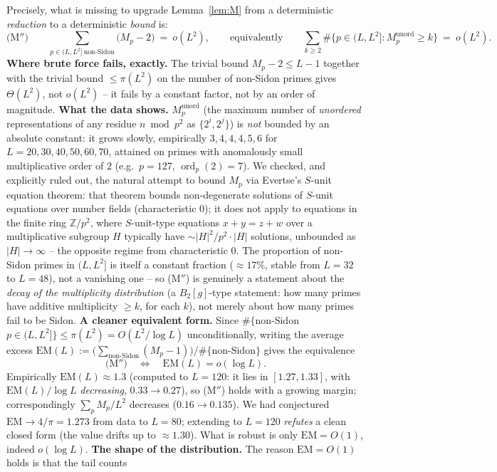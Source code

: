 \documentclass[11pt]{article}
\theoremstyle{plain}
\theoremstyle{definition}
\theoremstyle{remark}
\newcommand{\Z}{\mathbb{Z}}
\newcommand{\ord}{\operatorname{ord}}
\begin{document}
Precisely, what is missing to upgrade Lemma~\ref{lem:M} from a deterministic
\emph{reduction} to a deterministic \emph{bound} is:
\[
\text{(M$''$)}\qquad
\sum_{p\in(L,L^2]\ \mathrm{non\text{-}Sidon}}\bigl(M_p-2\bigr)\ =\ o(L^2),
\qquad\text{equivalently}\qquad
\sum_{k\ge2}\#\{p\in(L,L^2]:M_p^{\mathrm{unord}}\ge k\}\ =\ o(L^2).
\]
\textbf{Where brute force fails, exactly.} The trivial bound
$M_p-2\le L-1$ together with the trivial bound $\le\pi(L^2)$ on the number of
non-Sidon primes gives $\Theta(L^2)$, not $o(L^2)$ -- it fails by a constant
factor, not by an order of magnitude. \textbf{What the data shows.}
$M_p^{\mathrm{unord}}$ (the maximum number of \emph{unordered}
representations of any residue $n\bmod p^2$ as $\{2^i,2^j\}$) is \emph{not}
bounded by an absolute constant: it grows slowly, empirically
$3,4,4,4,5,6$ for $L=20,30,40,50,60,70$, attained on primes with anomalously
small multiplicative order of $2$ (e.g.\ $p=127$, $\ord_p(2)=7$). We checked,
and explicitly ruled out, the natural attempt to bound $M_p$ via Evertse's
$S$-unit equation theorem: that theorem bounds non-degenerate solutions of
$S$-unit equations over number fields (characteristic $0$); it does not
apply to equations in the finite ring $\Z/p^2$, where $S$-unit-type equations
$x+y=z+w$ over a multiplicative subgroup $H$ typically have
$\sim|H|^2/p^2\cdot|H|$ solutions, unbounded as $|H|\to\infty$ -- the
opposite regime from characteristic $0$. The proportion of non-Sidon primes
in $(L,L^2]$ is itself a constant fraction ($\approx17\%$, stable from
$L=32$ to $L=48$), not a vanishing one -- so (M$''$) is genuinely a
statement about the \emph{decay of the multiplicity distribution} (a
$B_2[g]$-type statement: how many primes have additive multiplicity $\ge k$,
for each $k$), not merely about how many primes fail to be Sidon. \textbf{A cleaner equivalent form.} Since $\#\{$non-Sidon $p\in(L,L^2]\}\le
\pi(L^2)=O(L^2/\log L)$ unconditionally, writing the average excess
$\mathrm{EM}(L):=\bigl(\sum_{\text{non-Sidon}}(M_p-1)\bigr)/\#\{\text{non-Sidon}\}$
gives the equivalence
\[
\text{(M$''$)}\quad\Longleftrightarrow\quad \mathrm{EM}(L)=o(\log L).
\]
Empirically $\mathrm{EM}(L)\approx1.3$ (computed to $L=120$: it lies in
$[1.27,1.33]$, with $\mathrm{EM}(L)/\log L$ \emph{decreasing}, $0.33\to0.27$),
so (M$''$) holds with a growing margin; correspondingly $\sum_pM_p/L^2$
decreases ($0.16\to0.135$). We had conjectured $\mathrm{EM}\to4/\pi=1.273$ from
data to $L=80$; extending to $L=120$ \emph{refutes} a clean closed form
(the value drifts up to $\approx1.30$). What is robust is only
$\mathrm{EM}=O(1)$, indeed $o(\log L)$. \textbf{The shape of the
distribution.} The reason $\mathrm{EM}=O(1)$ holds is that the tail counts
\end{document}
